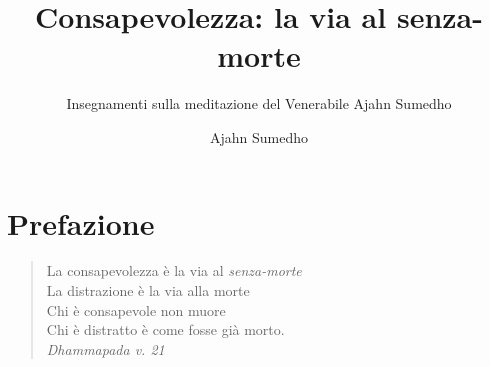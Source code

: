 \documentclass[11pt,twoside,final]{memoir}
\title{Consapevolezza: la via al senza-morte}
\subtitle{Insegnamenti sulla meditazione del Venerabile Ajahn Sumedho}
\author{Ajahn Sumedho}
\date{}
\begin{document}
\emptysheet


\frontmatter*
\midsloppy


\cleartoverso
\thispagestyle{empty}



\cleartorecto
\thispagestyle{empty}



\cleartoverso
\thispagestyle{empty}



\cleartorecto
\thispagestyle{empty}





\cleartorecto
\tableofcontents*



\chapter{Prefazione}



\cleartorecto
\thispagestyle{empty}
{\raggedleft\vspace*{5em}

\begin{minipage}{0.8\linewidth}
\raggedright

\begin{quote}
La consapevolezza è la via al \textit{senza-morte}\\
La distrazione è la via alla morte\\
Chi è consapevole non muore\\
Chi è distratto è come fosse già morto.\\

{\small\textit{Dhammapada v. 21}}
\end{quote}

\end{minipage}

}
\end{document}
